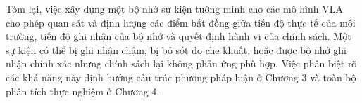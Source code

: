 Tóm lại, việc xây dựng một bộ nhớ sự kiện tường minh cho các mô hình VLA cho phép quan sát và định lượng các điểm bất đồng giữa tiến độ thực tế của môi trường, tiến độ ghi nhận của bộ nhớ và quyết định hành vi của chính sách. Một sự kiện có thể bị ghi nhận chậm, bị bỏ sót do che khuất, hoặc được bộ nhớ ghi nhận chính xác nhưng chính sách lại không phản ứng phù hợp. Việc phân biệt rõ các khả năng này định hướng cấu trúc phương pháp luận ở Chương 3 và toàn bộ phân tích thực nghiệm ở Chương 4.
